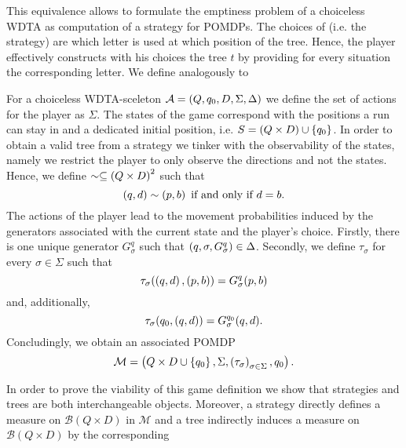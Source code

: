 This equivalence allows to formulate the emptiness problem of a choiceless
\ac{WDTA} as computation of a strategy for \acp{POMDP}. The choices of \eve{}
(i.e.  the strategy) are which letter is used at which position of the tree.
Hence, the player effectively constructs with his choices the tree $t$ by
providing for every situation the corresponding letter. We define analogously
to \cite[Section 3.5 Emptiness Problem]{RandAutoInfTrees}
\begin{definition}
  For a choiceless \ac{WDTA}-sceleton
  $\mathcal{A} = \left(Q, q_{0}, D, \Sigma, \Delta\right)$ we define the set of 
  actions for the player as $\Sigma$. The states of the game correspond with 
  the positions a run can stay in and a dedicated initial position, i.e. 
  $S = \left(Q\times D\right)\cup\left\{q_{0}\right\}$. In order to obtain a valid tree
  from a strategy we tinker with the observability of the states, namely we
  restrict the player to only observe the directions and not the states. Hence,
  we define $\sim\subseteq\left(Q\times D\right)^{2}$ such that
  \begin{equation*}
    \left(q, d\right)\sim\left(p, b\right)\text{ if and only if }d = b.
  \end{equation*}
  The actions of the player lead to the movement probabilities induced by the
  generators associated with the current state and the player's choice. 
  Firstly, there is one unique generator $G_{\sigma}^{q}$ such that 
  $\left(q,\sigma,G_{\sigma}^{q}\right)\in\Delta$. Secondly, we define 
  $\tau_{\sigma}$ for every $\sigma\in\Sigma$ such that
  \begin{equation*}
    \tau_{\sigma}(\left(q,d\right),\left(p,b\right)) = G_{\sigma}^{q}(p,b)
  \end{equation*}
  and, additionally,
  \begin{equation*}
    \tau_{\sigma}(q_{0},\left(q,d\right)) = G_{\sigma}^{q_{0}}(q,d).
  \end{equation*}
  Concludingly, we obtain an associated \ac{POMDP}
  \begin{equation*}
    \mathcal{M} = \left(
      Q\times D\cup \left\{q_{0}\right\}, \Sigma, 
        \left(\tau_{\sigma}\right)_{\sigma\in\Sigma}, q_{0}
    \right).
  \end{equation*}
\end{definition}
In order to prove the viability of this game definition we show that strategies
and trees are both interchangeable objects. Moreover, a strategy directly
defines a measure on $\mathcal{B}(Q\times D)$ in $\mathcal{M}$ and a tree
indirectly induces a measure on $\mathcal{B}(Q\times D)$ by the corresponding
